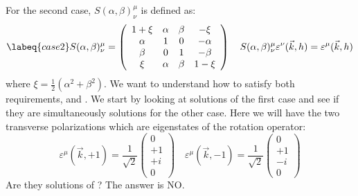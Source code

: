 \documentclass[../main.tex]{subfiles}
\begin{document}
For the second case, $S(\alpha,\beta)^\mu_\nu$ is defined as:
\begin{equation}
\labeq{case2}
S(\alpha,\beta)^\mu_\nu=\left(\begin{array}{cccc}
    1+\xi & \alpha & \beta & -\xi \\
    \alpha & 1 & 0 & -\alpha \\
    \beta & 0 & 1 & -\beta \\
    \xi & \alpha & \beta & 1-\xi
\end{array}\right) \quad S(\alpha,\beta)^\mu_\nu\varepsilon^\nu(\vec{k},h)=\varepsilon^\mu(\vec{k},h)
\end{equation}
where $\xi=\frac{1}{2}(\alpha^2+\beta^2)$. We want to understand how to satisfy both requirements,  and . We start by looking at solutions of the first case and see if they are simultaneously solutions for the other case. Here we will have the two transverse polarizations which are eigenstates of the rotation operator:\marginnote{\[
R(\theta)^\mu_\nu=\left(\begin{array}{cccc}
    1 & 0 & 0 & 0 \\
    0 & \cos\theta & -\sin\theta & 0\\
    0 & \sin\theta & \cos\theta & 0 \\
    0 & 0 & 0 & 1
\end{array}\right)
\]}
\[
\varepsilon^\mu(\vec{k},+1)=\frac{1}{\sqrt{2}}\left(\begin{array}{c}
    0 \\
    +1 \\
    +i \\
    0
\end{array}\right)
\quad
\varepsilon^\mu(\vec{k},-1)=\frac{1}{\sqrt{2}}\left(\begin{array}{c}
    0 \\
    +1 \\
    -i \\
    0
\end{array}\right)
\]
Are they solutions of ? The answer is NO.
\end{document}
